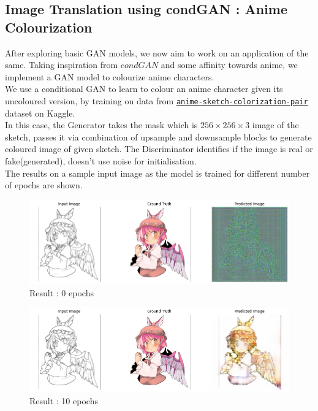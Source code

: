 \documentclass[conference]{IEEEtran}
\begin{document}
\subsection{Image Translation using condGAN : Anime Colourization}
\noindent 
After exploring basic GAN models, we now aim to work on an application of the same. Taking inspiration from $condGAN$ and some affinity towards anime, we implement a GAN model to colourize anime characters. \\ 
We use a conditional GAN to learn to colour an anime character given its uncoloured version, by training on data from \href{https://www.kaggle.com/datasets/ktaebum/anime-sketch-colorization-pair}{\texttt{anime-sketch-colorization-pair}} dataset on Kaggle.\\ In this case, the Generator takes the mask which is $256\times256\times3$ image of the sketch, passes it via combination of upsample and downsample blocks to generate coloured image of given sketch. The Discriminator identifies if the image is real or fake(generated), doesn't use noise for initialisation.\\
The results on a sample input image as the model is trained for different number of epochs are shown. 
\begin{figure}[h]
\centering
\includegraphics[scale = 0.25]{0ep.png}
  \caption{Result : 0 epochs}
\end{figure}

\begin{figure}[h]
\centering
\includegraphics[scale = 0.25]{10ep.png}
  \caption{Result : 10 epochs}
\end{figure}
\end{document}
